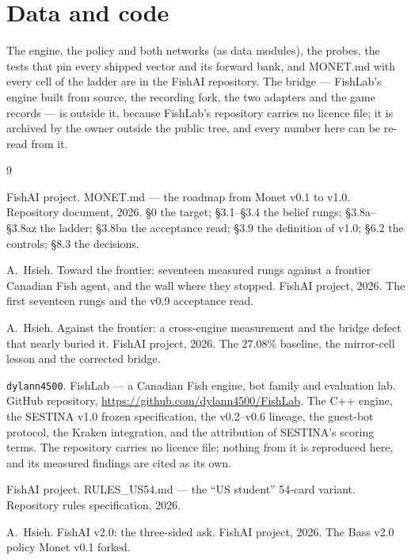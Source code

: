 \documentclass[11pt]{article}
\newcommand{\code}[1]{\texttt{#1}}
\newcommand{\monet}{MONET.md}
\begin{document}
\section*{Data and code}

The engine, the policy and both networks (as data modules), the probes, the tests that pin every
shipped vector and its forward bank, and \monet{} with every cell of the ladder are in the FishAI
repository. The bridge --- FishLab's engine built from source, the recording fork, the two adapters
and the game records --- is outside it, because FishLab's repository carries no licence file; it is
archived by the owner outside the public tree, and every number here can be re-read from it.

\begin{thebibliography}{9}
\footnotesize

FishAI project. MONET.md --- the roadmap from Monet v0.1 to v1.0. Repository document, 2026.
\S0 the target; \S3.1--\S3.4 the belief rungs; \S3.8a--\S3.8az the ladder; \S3.8ba the acceptance
read; \S3.9 the definition of v1.0; \S6.2 the controls; \S8.3 the decisions.

A.~Hsieh. Toward the frontier: seventeen measured rungs against a frontier Canadian Fish agent, and
the wall where they stopped. FishAI project, 2026. The first seventeen rungs and the v0.9 acceptance
read.

A.~Hsieh. Against the frontier: a cross-engine measurement and the bridge defect that nearly buried
it. FishAI project, 2026. The $27.08\%$ baseline, the mirror-cell lesson and the corrected bridge.

\code{dylann4500}. FishLab --- a Canadian Fish engine, bot family and evaluation lab. GitHub
repository, \url{https://github.com/dylann4500/FishLab}. The C++ engine, the SESTINA v1.0 frozen
specification, the v0.2--v0.6 lineage, the guest-bot protocol, the Kraken integration, and the
attribution of SESTINA's scoring terms. The repository carries no licence file; nothing from it is
reproduced here, and its measured findings are cited as its own.

FishAI project. RULES\_US54.md --- the ``US student'' 54-card variant. Repository rules
specification, 2026.

A.~Hsieh. FishAI v2.0: the three-sided ask. FishAI project, 2026. The Bass v2.0 policy Monet v0.1
forked.

\end{thebibliography}
\end{document}
